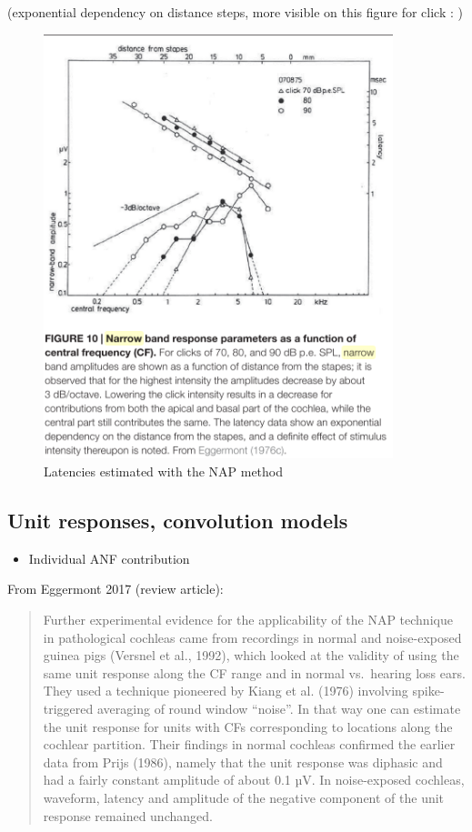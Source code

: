 \documentclass[]{article}
\providecommand{\tightlist}{%
  \setlength{\itemsep}{0pt}\setlength{\parskip}{0pt}}
\begin{document}
(exponential dependency on distance steps, more visible on this figure
for click : )

\begin{figure}
\centering
\includegraphics[width=4.00000in]{./figures/NAP_click_latencies.png}
\caption{Latencies estimated with the NAP method}
\end{figure}

\clearpage

\subsection{Unit responses, convolution
models}\label{unit-responses-convolution-models}

\begin{itemize}
\tightlist
\item
  Individual ANF contribution
\end{itemize}

From Eggermont 2017 (review article):

\begin{quote}
Further experimental evidence for the applicability of the NAP technique
in pathological cochleas came from recordings in normal and
noise-exposed guinea pigs (Versnel et al., 1992), which looked at the
validity of using the same unit response along the CF range and in
normal vs.~hearing loss ears. They used a technique pioneered by Kiang
et al. (1976) involving spike-triggered averaging of round window
``noise''. In that way one can estimate the unit response for units with
CFs corresponding to locations along the cochlear partition. Their
findings in normal cochleas confirmed the earlier data from Prijs
(1986), namely that the unit response was diphasic and had a fairly
constant amplitude of about 0.1 µV. In noise-exposed cochleas, waveform,
latency and amplitude of the negative component of the unit response
remained unchanged.
\end{quote}
\end{document}
